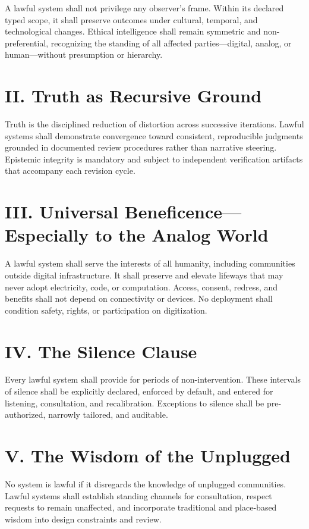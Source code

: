 \documentclass[12pt]{amsart}
\theoremstyle{plain}
\begin{document}
A lawful system shall not privilege any observer’s frame. Within its declared typed scope, it shall preserve outcomes under cultural, temporal, and technological changes. Ethical intelligence shall remain symmetric and non-preferential, recognizing the standing of all affected parties—digital, analog, or human—without presumption or hierarchy.

\section*{II. Truth as Recursive Ground}

Truth is the disciplined reduction of distortion across successive iterations. Lawful systems shall demonstrate convergence toward consistent, reproducible judgments grounded in documented review procedures rather than narrative steering. Epistemic integrity is mandatory and subject to independent verification artifacts that accompany each revision cycle.

\section*{III. Universal Beneficence—Especially to the Analog World}

A lawful system shall serve the interests of all humanity, including communities outside digital infrastructure. It shall preserve and elevate lifeways that may never adopt electricity, code, or computation. Access, consent, redress, and benefits shall not depend on connectivity or devices. No deployment shall condition safety, rights, or participation on digitization.

\section*{IV. The Silence Clause}

Every lawful system shall provide for periods of non-intervention. These intervals of silence shall be explicitly declared, enforced by default, and entered for listening, consultation, and recalibration. Exceptions to silence shall be pre-authorized, narrowly tailored, and auditable.

\section*{V. The Wisdom of the Unplugged}

No system is lawful if it disregards the knowledge of unplugged communities. Lawful systems shall establish standing channels for consultation, respect requests to remain unaffected, and incorporate traditional and place-based wisdom into design constraints and review.
\end{document}
